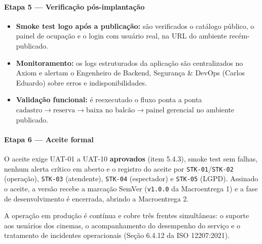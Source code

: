 \paragraph{Etapa 5 — Verificação pós-implantação}

\begin{itemize}
\item \textbf{Smoke test logo após a publicação:} são verificados o catálogo público, o painel de ocupação e o login com usuário real, na URL do ambiente recém-publicado.
\item \textbf{Monitoramento:} os logs estruturados da aplicação são centralizados no Axiom e alertam o Engenheiro de Backend, Segurança \& DevOps (Carlos Eduardo) sobre erros e indisponibilidades.
\item \textbf{Validação funcional:} é reexecutado o fluxo ponta a ponta $\text{cadastro} \to \text{reserva} \to \text{baixa no balcão} \to \text{painel gerencial}$ no ambiente publicado.
\end{itemize}

\paragraph{Etapa 6 — Aceite formal}

O aceite exige UAT-01 a UAT-10 \textbf{aprovados} (item 5.4.3), smoke test sem falhas, nenhum alerta crítico em aberto e o registro do aceite por \texttt{STK-01}/\texttt{STK-02} (operação), \texttt{STK-03} (atendente), \texttt{STK-04} (espectador) e \texttt{STK-05} (LGPD). Assinado o aceite, a versão recebe a marcação SemVer (\texttt{v1.0.0} da Macroentrega 1) e a fase de desenvolvimento é encerrada, abrindo a Macroentrega 2.



A operação em produção é contínua e cobre três frentes simultâneas: o suporte aos usuários dos cinemas, o acompanhamento do desempenho do serviço e o tratamento de incidentes operacionais (Seção 6.4.12 da ISO 12207:2021).

